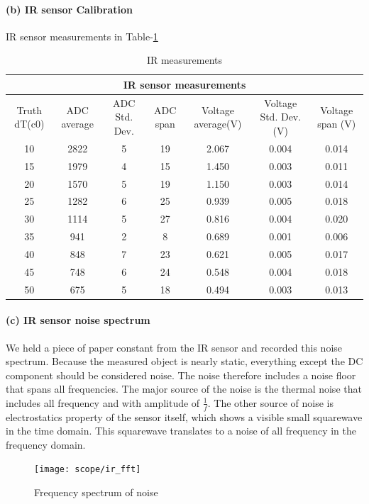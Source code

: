 \documentclass[a4paper]{article}
\newlength{\pic}
\begin{document}
\paragraph{(b) IR sensor Calibration}	IR sensor measurements in Table-\ref{tab2}

\begin{table}
\tiny
\center
  \begin{tabular}{|c|c|c|c|c|c|c|}
    \hline
    \multicolumn{7}{|c|}{IR sensor measurements} \\
    \hline
    Truth dT(c0) & ADC average & ADC Std. Dev. & ADC span & Voltage average(V) & Voltage Std. Dev.(V) & Voltage span (V)\\
    \hline
	10 & 2822 & 5 & 19 & 2.067 & 0.004 & 0.014\\
	15 & 1979 & 4 & 15 & 1.450 & 0.003 & 0.011\\
	20 & 1570 & 5 & 19 & 1.150 & 0.003 & 0.014\\
	25 & 1282 & 6 & 25 & 0.939 & 0.005 & 0.018\\
	30 & 1114 & 5 & 27 & 0.816 & 0.004 & 0.020\\
	35 & 941 & 2 & 8 & 0.689 & 0.001 & 0.006\\
	40 & 848 & 7 & 23 & 0.621 & 0.005 & 0.017\\
	45 & 748 & 6 & 24 & 0.548 & 0.004 & 0.018\\
	50 & 675 & 5 & 18 & 0.494 & 0.003 & 0.013\\
    \hline
  \end{tabular}
  \caption{IR measurements}
  \label{tab2}
\end{table}

\paragraph{(c) IR sensor noise spectrum} We held a piece of paper constant from the IR sensor and recorded this noise
spectrum. Because the measured object is nearly static, everything except the DC component should be considered noise.
The noise therefore includes a noise floor that spans all frequencies. The major source of the noise is the thermal noise
that includes all frequency and with amplitude of $ \frac{1}{f} $. The other source of noise is electrostatics property
of the sensor itself, which shows a visible small squarewave in the time domain. This squarewave translates to a noise
of all frequency in the frequency domain.

\setlength{\pic}{0.8\textwidth}
\begin{figure}[htp]
\center
\texttt{[image: scope/ir\_fft]}
\caption{Frequency spectrum of noise}
\label{noise}
\end{figure}
\end{document}
